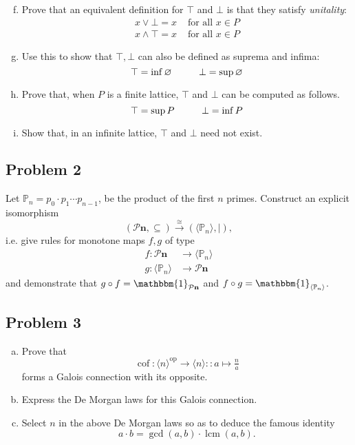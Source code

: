 \documentclass{amsart}
\DeclareMathOperator{\lcm}{lcm}
\newcommand{\an}[1]{\langle #1 \rangle}
\newcommand{\To}[1]{\xrightarrow{#1}}
\newcommand{\Id}[1]{\mathbbm{1}_{#1}}
\def\op{^{\text{op}}}
\def\PP{\mathbb P}
\begin{document}
\begin{enumerate}[(a)]\setcounter{enumi}{5}
    \item Prove that an equivalent definition for $\top$ and $\bot$ is that they satisfy \emph{unitality}:
   \begin{align*}
    x\vee \bot = x &\text{ for all } x\in P \\
    x\wedge \top = x &\text{ for all } x\in P
\end{align*}

    \item Use this to show that $\top,\bot$ can also be defined as suprema and infima:
    \[\top = \inf\varnothing \hspace{10 mm} \bot = \sup\varnothing\]
    \item Prove that, when $P$ is a finite lattice, $\top$ and $\bot$ can be computed as follows. \[\top = \sup P \hspace{10 mm} \bot = \inf P\]
    
    \item Show that, in an infinite lattice, $\top$ and $\bot$ need not exist.
\end{enumerate}

\subsection{Problem 2}

\noindent Let $\PP_n=p_0\cdot p_1\cdots p_{n-1}$, be the product of the first $n$ primes.
Construct an explicit isomorphism
\[(\mathcal{P}\mathbf{n},\subseteq)\To{\cong}(\an{\PP_n},|),\]
i.e. give rules for monotone maps $f,g$ of type
\begin{align*}
    f:\mathcal{P}\mathbf{n}&\to \an{\PP_n} \\
    g: \an{\PP_n} &\to \mathcal{P}\mathbf{n}
\end{align*}
and demonstrate that $g\circ f =\Id{\mathcal{P}\mathbf{n}}$ and $f\circ g=\Id{\an{\PP_n}}$.

\subsection{Problem 3}

\begin{enumerate}[(a)]
    \item Prove that
\[\operatorname{cof}:{\an{n}}\op\to \an{n}::a\mapsto\tfrac{n}{a}\]
forms a Galois connection with its opposite.

    \item Express the De Morgan laws for this Galois connection.
    
    \item Select $n$ in the above De Morgan laws so as to deduce the famous identity
    \[a\cdot b = \gcd(a,b)\cdot\lcm(a,b).\]
\end{enumerate}
\end{document}
